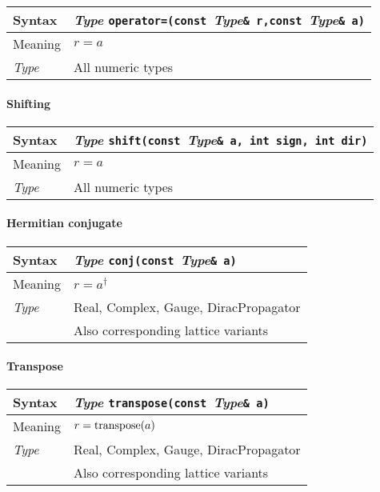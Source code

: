 \documentclass[12pt,letterpaper]{article}
\newcommand{\tReal}{Real}
\newcommand{\tComplex}{Complex}
\newcommand{\tColorMatrix}{Gauge}
\newcommand{\tDiracPropagator}{DiracPropagator}
\newcommand{\allNumericTypes}{All numeric types}
\newcommand{\simLatticeVariants}{Also corresponding lattice variants}
\newcommand{\itt}{\it Type}
\newcommand{\protoUnaryShift}{{\it Type }{\tt shift(const }{\it Type}{\tt \& a, int sign, int dir)}}
\newcommand{\protoUnaryQual}[1]{{\it Type }{\tt #1}{\tt (const }{\it Type}{\tt \& a)}}
\newcommand{\protoAssignmentQual}[1]{{\it Type }{\tt #1}{\tt (const }{\it Type}{\tt \& r,}{\tt const }{\it Type}{\tt \& a)}}
\begin{document}
\begin{flushleft}
  \begin{tabular}{|l|l|}
  \hline
  Syntax      & \protoAssignmentQual{operator=} \\
  \hline
  Meaning     & $r = a$ \\
  \hline
  \itt     & \allNumericTypes \\
  \hline
  \end{tabular}
\end{flushleft}

\paragraph{Shifting}

\begin{flushleft}
  \begin{tabular}{|l|l|}
  \hline
  Syntax      & \protoUnaryShift  \\
  \hline
  Meaning     & $r = a$ \\
  \hline
  \itt     & \allNumericTypes \\
  \hline
  \end{tabular}
\end{flushleft}


\paragraph{Hermitian conjugate}

\begin{flushleft}
  \begin{tabular}{|l|l|}
  \hline
  Syntax      & \protoUnaryQual{\tt conj}  \\
  \hline
  Meaning     & $r = a^\dagger$ \\
  \hline
  \itt        & \tReal, \tComplex, \tColorMatrix, \tDiracPropagator \\
              & \simLatticeVariants \\
  \hline
  \end{tabular}
\end{flushleft}

\paragraph{Transpose}

\begin{flushleft}
  \begin{tabular}{|l|l|}
  \hline
  Syntax      & \protoUnaryQual{\tt transpose}  \\
  \hline
  Meaning     & $r = {\rm transpose}(a)$ \\
  \hline
  \itt        & \tReal, \tComplex, \tColorMatrix, \tDiracPropagator \\
              & \simLatticeVariants \\
  \hline
  \end{tabular}
\end{flushleft}
\end{document}
